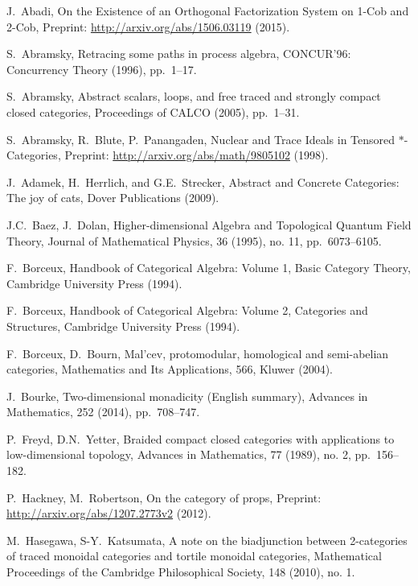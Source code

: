 \documentclass[11pt,oneside,article]{memoir}
\begin{document}
\begin{thebibliography}{XXX}

 J.~Abadi, On the Existence of an Orthogonal Factorization System on 1-Cob and 2-Cob, Preprint: \url{http://arxiv.org/abs/1506.03119} (2015).

 S.~Abramsky, Retracing some paths in process algebra, CONCUR'96: Concurrency Theory (1996), pp.~1--17.

 S.~Abramsky, Abstract scalars, loops, and free traced and strongly compact closed categories, Proceedings of CALCO (2005), pp.~1--31.

 S.~Abramsky, R.~Blute, P.~Panangaden, Nuclear and Trace Ideals in Tensored $*$-Categories, Preprint: \url{http://arxiv.org/abs/math/9805102} (1998).

 J.~Adamek, H.~Herrlich, and G.E.~Strecker, Abstract and Concrete Categories: The joy of cats, Dover Publications (2009).

 J.C.~Baez, J.~Dolan, Higher-dimensional Algebra and Topological Quantum Field Theory, Journal of Mathematical Physics, 36 (1995), no. 11, pp.~6073--6105.

F.~Borceux, Handbook of Categorical Algebra: Volume 1, Basic Category Theory, Cambridge University Press (1994).

 F.~Borceux, Handbook of Categorical Algebra: Volume 2, Categories and Structures, Cambridge University Press (1994).

 F.~Borceux, D.~Bourn, Mal'cev, protomodular, homological and semi-abelian categories, Mathematics
 and Its Applications, 566, Kluwer (2004).

 J.~Bourke, Two-dimensional monadicity (English summary), Advances in Mathematics, 252 (2014), pp.~708--747.

 P.~Freyd, D.N.~Yetter, Braided compact closed categories with applications to low-dimensional topology,
Advances in Mathematics, 77 (1989), no. 2, pp.~156--182.

 P.~Hackney, M.~Robertson, On the category of props, Preprint: \url{http://arxiv.org/abs/1207.2773v2} (2012).

M.~Hasegawa, S-Y.~Katsumata, A note on the biadjunction between 2-categories of traced monoidal categories and tortile monoidal categories, Mathematical Proceedings of the Cambridge Philosophical Society, 148 (2010), no. 1.


\end{thebibliography}
\end{document}

